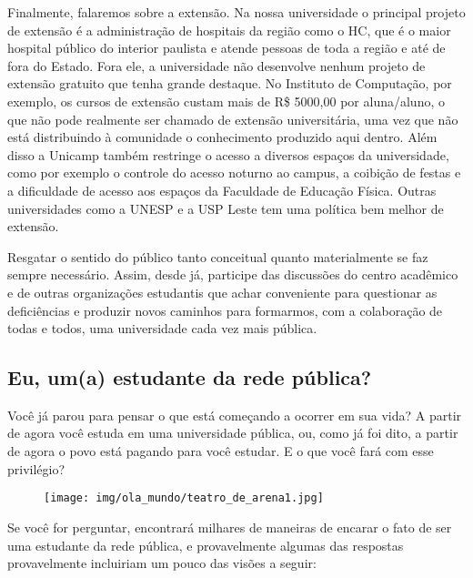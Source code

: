 Finalmente, falaremos sobre a extensão. Na nossa universidade o principal
projeto de extensão é a administração de hospitais da região como o HC, que é o
maior hospital público do interior paulista e atende pessoas de toda a região e
até de fora do Estado. Fora ele, a universidade não desenvolve nenhum projeto
de extensão gratuito que tenha grande destaque. No Instituto de Computação, por
exemplo, os cursos de extensão custam mais de R\$ 5000,00 por aluna/aluno, o
que não pode realmente ser chamado de extensão universitária, uma vez que não
está distribuindo à comunidade o conhecimento produzido aqui dentro. Além disso
a Unicamp também restringe o acesso a diversos espaços da universidade, como
por exemplo o controle do acesso noturno ao campus, a coibição de festas e a
dificuldade de acesso aos espaços da Faculdade de Educação Física. Outras
universidades como a UNESP e a USP Leste tem uma política bem melhor de
extensão.

Resgatar o sentido do público tanto conceitual quanto materialmente se faz
sempre necessário. Assim, desde já, participe das discussões do centro
acadêmico e de outras organizações estudantis que achar conveniente para
questionar as deficiências e produzir novos caminhos para formarmos, com a
colaboração de todas e todos, uma universidade cada vez mais pública.

\subsection*{Eu, um(a) estudante da rede pública?}

Você já parou para pensar o que está começando a ocorrer em sua vida? A partir
de agora você estuda em uma universidade pública, ou, como já foi dito, a
partir de agora o povo está pagando para você estudar. E o que você fará com
esse privilégio?

\begin{figure}[h!]
    \centering
    \texttt{[image: img/ola\_mundo/teatro\_de\_arena1.jpg]}
\end{figure}

Se você for perguntar, encontrará milhares de maneiras de encarar o fato de ser
uma estudante da rede pública, e provavelmente algumas das respostas
provavelmente incluiriam um pouco das visões a seguir:

